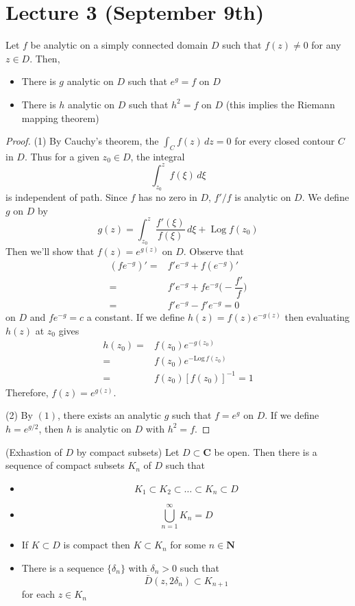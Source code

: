 \section{Lecture 3 (September 9th)}
\begin{lem}
Let $f$ be analytic on a simply connected domain $D$ such that $f(z)\ne 0$ for any $z\in D$. Then, 
\begin{itemize}
	\item[(i)] There is $g$ analytic on $D$ such that $e^{g}=f$ on $D$
	\item[(ii)] There is $h$ analytic on $D$ such that $h^2=f$ on $D$ (this implies the Riemann mapping theorem)
\end{itemize}
\end{lem}
\vspace{2ex}
\begin{proof}
(1) By Cauchy's theorem, the $\int _{C}f(z)\,dz=0$ for every closed contour $C$ in $D$. Thus for a given $z_0\in D$, the integral 
\[\int ^{z}_{z_0}f(\xi )\,d\xi \]
is independent of path. Since $f$ has no zero in $D$, $f'/f$ is analytic on $D$. We define $g$ on $D$ by 
\[g(z)=\int ^{z}_{z_0}\dfrac{f'(\xi )}{f(\xi )}\,d\xi +\mathop{\mathrm{Log}}f(z_0)\]
Then we'll show that $f(z)=e^{g(z)}$ on $D$. Observe that 
\[\begin{align*}
	(fe^{-g})'=&f'e^{-g}+f(e^{-g})'\\
	=&f'e^{-g}+fe^{-g}\Big(-\dfrac{f'}{f}\Big)\\ 
	=&f'e^{-g}-f'e^{-g}=0
\end{align*}\]
on $D$ and $fe^{-g}=c$ a constant. If we define $h(z)=f(z)e^{-g(z)}$ then evaluating $h(z)$ at $z_0$ gives
\[\begin{align*}
	h(z_0)=&f(z_0)e^{-g(z_0)}\\
	=&f(z_0)e^{-\mathrm{Log}\,f(z_0)}\\
	=&f(z_0)[f(z_0)]^{-1}=1
\end{align*}\]
Therefore, $f(z)=e^{g(z)}$.

\bigskip

(2) By $(1)$, there exists an analytic $g$ such that $f=e^{g}$ on $D$. If we define $h=e^{g/2}$, then $h$ is analytic on $D$ with $h ^2=f$. 
\end{proof}
\vspace{2ex}
\begin{thm}
(Exhastion of $D$ by compact subsets) Let $D\subset {\bm C}$ be open. Then there is a sequence of compact subsets $K_{n}$ of $D$ such that
\begin{itemize}
	\item[(i)] \[K_1\subset K_2\subset \ldots \subset K_{n}\subset D\]
	\item[(ii)] \[ \bigcup ^{\infty }_{n=1}K_{n}=D\]
	\item[(iii)] If $K\subset D$ is compact then $K\subset K_{n}$ for some $n\in {\bm N}$
	\item[(iv)] There is a sequence $\{\delta _{n}\}$ with $\delta _{n}>0$ such that
		\[\bar{D}(z,2\delta _{n})\subset K_{n+1}\] for each $z\in K_{n}$
\end{itemize}
\end{thm}
